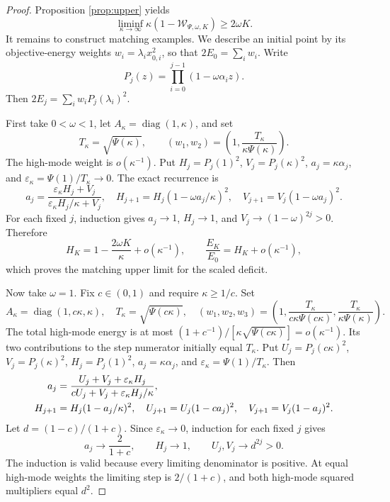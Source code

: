 \documentclass[11pt,a4paper]{article}
\theoremstyle{remark}
\newcommand{\diag}{\operatorname{diag}}
\newcommand{\W}{\mathcal W}
\begin{document}
\begin{proof}
Proposition \ref{prop:upper} yields
\[
 \liminf_{\kappa\to\infty}\kappa(1-\W_{\Psi,\omega,K})\ge2\omega K.
\]
It remains to construct matching examples. We describe an initial point by its objective-energy weights $w_i=\lambda_i x_{0,i}^2$, so that $2E_0=\sum_iw_i$. Write
\[
 P_j(z)=\prod_{i=0}^{j-1}(1-\omega\alpha_i z).
\]
Then $2E_j=\sum_iw_iP_j(\lambda_i)^2$.

First take $0<\omega<1$, let $A_\kappa=\diag(1,\kappa)$, and set
\[
 T_\kappa=\sqrt{\Psi(\kappa)},\qquad
 (w_1,w_2)=\left(1,\frac{T_\kappa}{\kappa\Psi(\kappa)}\right).
\]
The high-mode weight is $o(\kappa^{-1})$. Put $H_j=P_j(1)^2$, $V_j=P_j(\kappa)^2$, $a_j=\kappa\alpha_j$, and $\varepsilon_\kappa=\Psi(1)/T_\kappa\to0$. The exact recurrence is
\[
 a_j=\frac{\varepsilon_\kappa H_j+V_j}{\varepsilon_\kappa H_j/\kappa+V_j},
 \quad H_{j+1}=H_j(1-\omega a_j/\kappa)^2,
 \quad V_{j+1}=V_j(1-\omega a_j)^2.
\]
For each fixed $j$, induction gives $a_j\to1$, $H_j\to1$, and $V_j\to(1-\omega)^{2j}>0$. Therefore
\[
 H_K=1-\frac{2\omega K}{\kappa}+o(\kappa^{-1}),\qquad
 \frac{E_K}{E_0}=H_K+o(\kappa^{-1}),
\]
which proves the matching upper limit for the scaled deficit.

Now take $\omega=1$. Fix $c\in(0,1)$ and require $\kappa\ge1/c$. Set
\begin{equation}\label{eq:generalconstruction}
 A_\kappa=\diag(1,c\kappa,\kappa),\quad
 T_\kappa=\sqrt{\Psi(c\kappa)},\quad
 (w_1,w_2,w_3)=\left(1,\frac{T_\kappa}{c\kappa\Psi(c\kappa)},
 \frac{T_\kappa}{\kappa\Psi(\kappa)}\right).
\end{equation}
The total high-mode energy is at most $(1+c^{-1})/[\kappa\sqrt{\Psi(c\kappa)}]=o(\kappa^{-1})$. Its two contributions to the step numerator initially equal $T_\kappa$. Put $U_j=P_j(c\kappa)^2$, $V_j=P_j(\kappa)^2$, $H_j=P_j(1)^2$, $a_j=\kappa\alpha_j$, and $\varepsilon_\kappa=\Psi(1)/T_\kappa$. Then
\begin{align}
 a_j&=\frac{U_j+V_j+\varepsilon_\kappa H_j}
 {cU_j+V_j+\varepsilon_\kappa H_j/\kappa},\label{eq:recurrence}\\
 H_{j+1}&=H_j(1-a_j/\kappa)^2,\quad
 U_{j+1}=U_j(1-ca_j)^2,\quad
 V_{j+1}=V_j(1-a_j)^2.\notag
\end{align}
Let $d=(1-c)/(1+c)$. Since $\varepsilon_\kappa\to0$, induction for each fixed $j$ gives
\begin{equation}\label{eq:limiting}
 a_j\longrightarrow\frac2{1+c},\qquad H_j\longrightarrow1,
 \qquad U_j,V_j\longrightarrow d^{2j}>0.
\end{equation}
The induction is valid because every limiting denominator is positive. At equal high-mode weights the limiting step is $2/(1+c)$, and both high-mode squared multipliers equal $d^2$.


\end{proof}
\end{document}
